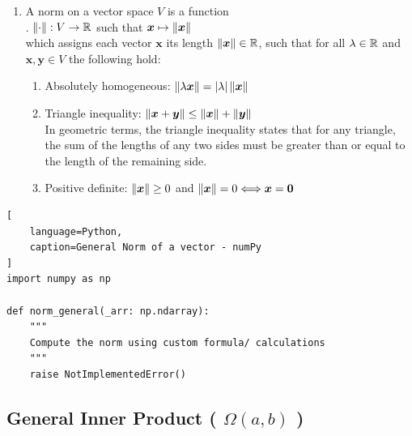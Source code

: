 \begin{enumerate}
    \item
    \begin{definition}[Norm]
        A norm on a vector space $V$ is a function
        \hfill \cite{mfml/book/mml/Deisenroth-Faisal-Ong}
        \\
        .\hfill
        $\left\| \cdot \right\|: V \to \mathbb{R}$ such that $\bm{x} \mapsto \left\| \bm{x} \right\|$
        \hfill \cite{mfml/book/mml/Deisenroth-Faisal-Ong}
        \\
        which assigns each vector $\bm{x}$ its length $\left\| \bm{x} \right\| \in \mathbb{R}$, such that for all $\lambda \in \mathbb{R}$ and $\bm{x}, \bm{y} \in V$ the following hold:
        \hfill \cite{mfml/book/mml/Deisenroth-Faisal-Ong}
    \end{definition}
    \begin{enumerate}
        \item Absolutely homogeneous: $\left\| \lambda \bm{x} \right\| = \left| \lambda \right| \left\| \bm{x} \right\|$
        \hfill \cite{mfml/book/mml/Deisenroth-Faisal-Ong}

        \item Triangle inequality: $\left\| \bm{x} + \bm{y} \right\| \leq \left\| \bm{x} \right\| + \left\| \bm{y} \right\|$
        \hfill \cite{mfml/book/mml/Deisenroth-Faisal-Ong}
        \\
        In geometric terms, the triangle inequality states that for any triangle, the sum of the lengths of any two sides must be greater than or equal to the length of the remaining side.
        \hfill \cite{mfml/book/mml/Deisenroth-Faisal-Ong}

        \item Positive definite: $\left\| \bm{x} \right\| \geq 0$ and $\left\| \bm{x} \right\| = 0 \Longleftrightarrow \bm{x} = \bm{0}$
        \hfill \cite{mfml/book/mml/Deisenroth-Faisal-Ong}
    \end{enumerate}
\end{enumerate}




\begin{lstlisting}[
    language=Python,
    caption=General Norm of a vector - numPy
]
import numpy as np

def norm_general(_arr: np.ndarray):
    """
    Compute the norm using custom formula/ calculations
    """
    raise NotImplementedError()
\end{lstlisting}






\subsection{General Inner Product ( $\Omega(a, b)$ )}

